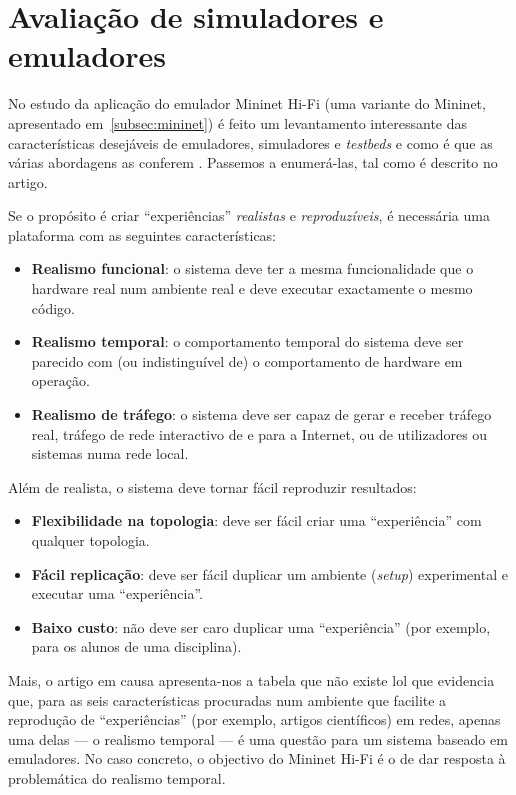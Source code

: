 \section{Avaliação de simuladores e emuladores}
\label{sec:evalsimulators}

No estudo da aplicação do emulador Mininet Hi-Fi (uma variante do Mininet, apresentado em~\ref{subsec:mininet}) é feito um levantamento interessante das características desejáveis de emuladores, simuladores e \emph{testbeds} e como é que as várias abordagens as conferem \cite{reproduciblemininethifi}. Passemos a enumerá-las, tal como é descrito no artigo.

Se o propósito é criar ``experiências'' \emph{realistas} e \emph{reproduzíveis}, é necessária uma plataforma com as seguintes características:
\begin{itemize}
	\item \textbf{Realismo funcional}: o sistema deve ter a mesma funcionalidade que o hardware real num ambiente real e deve executar exactamente o mesmo código.
	\item \textbf{Realismo temporal}: o comportamento temporal do sistema deve ser parecido com (ou indistinguível de) o comportamento de hardware em operação.
	\item \textbf{Realismo de tráfego}: o sistema deve ser capaz de gerar e receber tráfego real, tráfego de rede interactivo de e para a Internet, ou de utilizadores ou sistemas numa rede local.
\end{itemize}

Além de realista, o sistema deve tornar fácil reproduzir resultados:
\begin{itemize}
	\item \textbf{Flexibilidade na topologia}: deve ser fácil criar uma ``experiência'' com qualquer topologia.
	\item \textbf{Fácil replicação}: deve ser fácil duplicar um ambiente (\emph{setup}) experimental e executar uma ``experiência''.
	\item \textbf{Baixo custo}: não deve ser caro duplicar uma ``experiência'' (por exemplo, para os alunos de uma disciplina).
\end{itemize}

Mais, o artigo em causa apresenta-nos a tabela que não existe lol que evidencia que, para as seis características procuradas num ambiente que facilite a reprodução de ``experiências'' (por exemplo, artigos científicos) em redes, apenas uma delas --- o realismo temporal --- é uma questão para um sistema baseado em emuladores. No caso concreto, o objectivo do Mininet Hi-Fi é o de dar resposta à problemática do realismo temporal.


